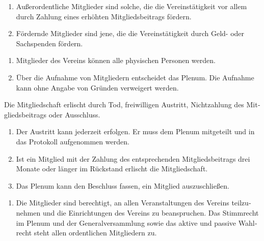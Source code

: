 \begin{otherlanguage}{german}
\begin{enumerate}[statutenenum]
    \item Außerordentliche Mitglieder sind solche, die die Vereinstätigkeit vor allem durch Zahlung eines erhöhten Mitgliedsbeitrags fördern.

    \item Fördernde Mitglieder sind jene, die die Vereinstätigkeit durch Geld- oder Sachspenden fördern.
\end{enumerate}


\begin{enumerate}[statutenenum]
    \item Mitglieder des Vereins können alle physischen Personen werden.

    \item Über die Aufnahme von Mitgliedern entscheidet das Plenum.
        Die Aufnahme kann ohne Angabe von Gründen verweigert werden.
\end{enumerate}


Die Mitgliedschaft erlischt durch Tod, freiwilligen Austritt, Nichtzahlung des Mitgliedsbeitrags oder Ausschluss.

\begin{enumerate}[statutenenum]
    \item Der Austritt kann jederzeit erfolgen.
        Er muss dem Plenum mitgeteilt und in das Protokoll aufgenommen werden.

    \item Ist ein Mitglied mit der Zahlung des entsprechenden Mitgliedsbeitrags drei Monate oder länger im Rückstand erlischt die Mitgliedschaft.

    \item Das Plenum kann den Beschluss fassen, ein Mitglied auszuschließen.
\end{enumerate}


\begin{enumerate}[statutenenum]
    \item Die Mitglieder sind berechtigt, an allen Veranstaltungen des Vereins teilzunehmen und die Einrichtungen des Vereins zu beanspruchen.
        Das Stimmrecht im Plenum und der Generalversammlung sowie das aktive und passive Wahlrecht steht allen ordentlichen Mitgliedern zu.


\end{enumerate}
\end{otherlanguage}
